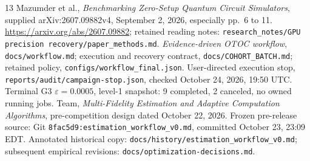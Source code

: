 \documentclass[11pt]{article}
\newcommand{\file}[1]{\nolinkurl{#1}}
\newcommand{\eps}{\varepsilon}
\begin{document}
\begin{thebibliography}{13}
 Mazumder et al., \emph{Benchmarking Zero-Setup Quantum Circuit Simulators}, supplied arXiv:2607.09882v4, September 2, 2026, especially pp.~6 to 11. \url{https://arxiv.org/abs/2607.09882}; retained reading notes: \file{research_notes/GPU precision recovery/paper_methods.md}.
 \emph{Evidence-driven OTOC workflow}, \file{docs/workflow.md}; execution and recovery contract, \file{docs/COHORT_BATCH.md}; retained policy, \file{configs/workflow_final.json}.
 User-directed execution stop, \file{reports/audit/campaign-stop.json}, checked October 24, 2026, 19:50 UTC. Terminal G3 $\eps=0.0005$, level-1 snapshot: 9 completed, 2 canceled, no owned running jobs.
 Team, \emph{Multi-Fidelity Estimation and Adaptive Computation Algorithms}, pre-competition design dated October 22, 2026. Frozen pre-release source: Git \file{8fac5d9:estimation_workflow_v0.md}, committed October 23, 23:09 EDT. Annotated historical copy: \file{docs/history/estimation_workflow_v0.md}; subsequent empirical revisions: \file{docs/optimization-decisions.md}.
\end{thebibliography}
\end{document}
